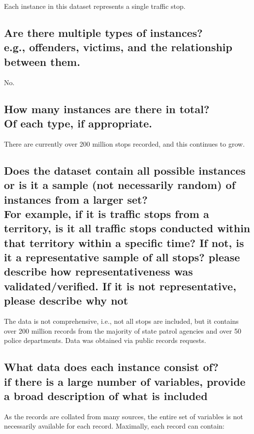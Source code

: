 \documentclass[letterpaper, 10 pt, conference]{ieeeconf}  %
\newcommand{\subtitle}[1]{{\\ \small \normalfont \color{purple} #1}}
\begin{document}
Each instance in this dataset represents a single traffic stop.

\subsection{Are there multiple types of instances? \subtitle{e.g., offenders, victims, and the relationship between them.}}

No.

\subsection{How many instances are there in total? \subtitle{Of each type, if appropriate.}}

There are currently over 200 million stops recorded, and this continues to grow.

\subsection{Does the dataset contain all possible instances or is it a sample (not necessarily random) of instances from a larger set? \subtitle{For example, if it is traffic stops from a territory, is it all traffic stops conducted within that territory within a specific time? If not, is it a representative sample of all stops? please describe how representativeness was validated/verified. If it is not representative, please describe why not}}

The data is not comprehensive, i.e., not all stops are included, but it contains over 200 million records from the majority of state patrol agencies and over
50 police departments. Data was obtained via public records requests.

\subsection{What data does each instance consist of? \subtitle{if there is a large number of variables, provide a broad description of what is included}}

As the records are collated from many sources, the entire set of variables is not necessarily available for each record. Maximally, each record can contain:
\end{document}
